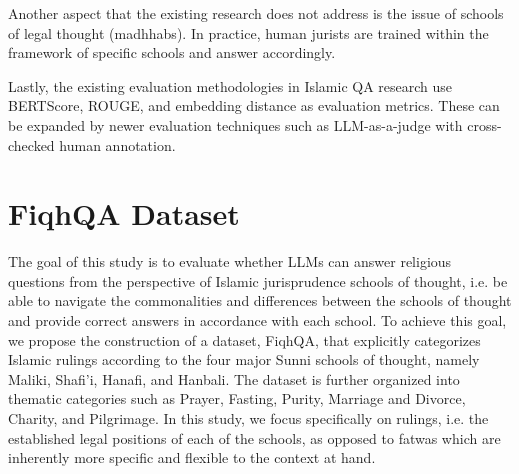 \documentclass[letterpaper]{article}
\begin{document}
Another aspect that the existing research does not address is the issue of schools of legal thought (madhhabs). In practice, human jurists are trained within the framework of specific schools and answer accordingly. 

Lastly, the existing evaluation methodologies in Islamic QA research use BERTScore, ROUGE, and embedding distance as evaluation metrics. These can be expanded by newer evaluation techniques such as LLM-as-a-judge with cross-checked human annotation.


\section{FiqhQA Dataset}
\label{sec:dataset}

The goal of this study is to evaluate whether LLMs can answer religious questions from the perspective of Islamic jurisprudence schools of thought, i.e. be able to navigate the commonalities and differences between the schools of thought and provide correct answers in accordance with each school. To achieve this goal, we propose the construction of a dataset, FiqhQA, that explicitly categorizes Islamic rulings according to the four major Sunni schools of thought, namely Maliki, Shafi'i, Hanafi, and Hanbali. The dataset is further organized into thematic categories such as Prayer, Fasting, Purity, Marriage and Divorce, Charity, and Pilgrimage. In this study, we focus specifically on rulings, i.e. the established legal positions of each of the schools, as opposed to fatwas which are inherently more specific and flexible to the context at hand. 


\end{document}
